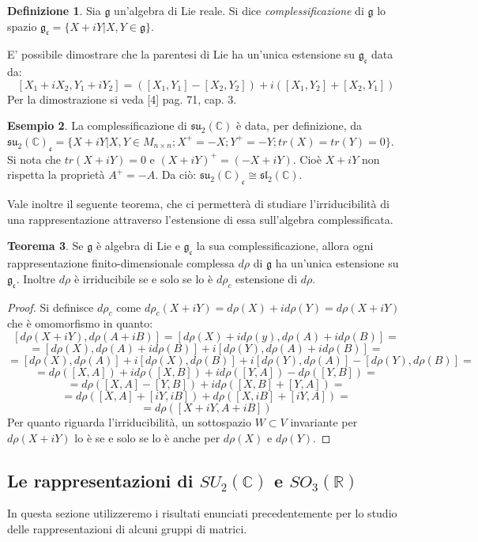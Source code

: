 \documentclass[12pt,a4paper]{report}
\theoremstyle{definition}
\newtheorem{Def}{Definizione}[chapter]
\newtheorem{Theo}[Def]{Teorema}
\theoremstyle{definition}
\newtheorem{Ex}[Def]{Esempio}
\theoremstyle{definition}
\theoremstyle{remark}
\begin{document}
\begin{Def}
	Sia $\mathfrak{g}$ un'algebra di Lie reale. Si dice \textit{complessificazione} di $\mathfrak{g}$ lo spazio $\mathfrak{g_c}=\{X+iY|X,Y\in\mathfrak{g}\}$.
\end{Def}
E' possibile dimostrare che la parentesi di Lie ha un'unica estensione su $\mathfrak{g_c}$ data da:
$$[X_1+iX_2,Y_1+iY_2]=([X_1,Y_1]-[X_2,Y_2])+i([X_1,Y_2]+[X_2,Y_1])$$
Per la dimostrazione si veda [4] pag. 71, cap. 3.\\
\begin{Ex}
La complessificazione di $\mathfrak{su_2(\mathbb{C})}$ è data, per definizione, da \\$\mathfrak{su_2(\mathbb{C})_c}=\{X+iY|X,Y\in M_{n\times n} ;X^{+}=-X;Y^{+}=-Y;tr(X)=tr(Y)=0\}$.\\
Si nota che $tr(X+iY)=0$ e $(X+iY)^+=(-X+iY)$. Cioè $X+iY$ non rispetta la proprietà $A^+=-A$. Da ciò: $\mathfrak{su_2(\mathbb{C})_c}\cong \mathfrak{sl_2(\mathbb{C})}$.
\end{Ex}
Vale inoltre il seguente teorema, che ci permetterà di studiare l'irriducibilità di una rappresentazione attraverso l'estensione di essa sull'algebra complessificata.
\begin{Theo}
	Se $\mathfrak{g}$ è algebra di Lie e $\mathfrak{g_c}$ la sua complessificazione, allora ogni rappresentazione finito-dimensionale complessa  $d\rho$ di $\mathfrak{g}$ ha un'unica estensione su $\mathfrak{g_c}$. Inoltre $d\rho$ è irriducibile se e solo se lo è $d\rho_c$ estensione di $d\rho$.
\end{Theo}
\begin{proof}
	Si definisce $d\rho_c$ come $d\rho_c(X+iY)=d\rho(X)+id\rho(Y)=d\rho(X+iY)$ che è omomorfismo in quanto: 
	$$[d\rho(X+iY),d\rho(A+iB)]=[d\rho(X)+id\rho(y),d\rho(A)+id\rho(B)]=$$$$=[d\rho(X),d\rho(A)+id\rho(B)]+i[d\rho(Y),d\rho(A)+id\rho(B)]=$$
	$$=[d\rho(X),d\rho(A)]+i[d\rho(X),d\rho(B)]+i[d\rho(Y),d\rho(A)]-[d\rho(Y),d\rho(B)]=$$
	$$=d\rho([X,A])+id\rho([X,B])+id\rho([Y,A])-d\rho([Y,B])=$$
	$$=d\rho([X,A]-[Y,B])+id\rho([X,B]+[Y,A])=$$
	$$=d\rho([X,A]+[iY,iB])+d\rho([X,iB]+[iY,A])=$$
	$$=d\rho([X+iY,A+iB])$$
	Per quanto riguarda l'irriducibilità, un sottospazio $W\subset V$ invariante per $d\rho(X+iY)$ lo è se e solo se lo è anche per $d\rho(X)$ e $d\rho(Y)$.
\end{proof}
\subsection{Le rappresentazioni di $SU_2(\mathbb{C})$ e $SO_3(\mathbb{R})$} 
In questa sezione utilizzeremo i risultati enunciati precedentemente per lo studio delle rappresentazioni di alcuni gruppi di matrici.\\
\end{document}
